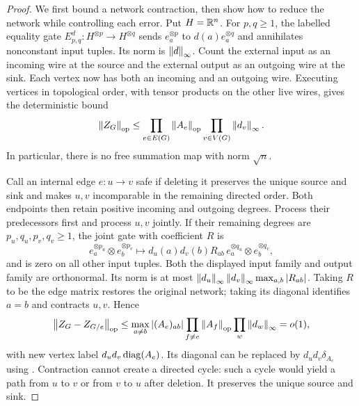 \begin{proof}
We first bound a network contraction, then show how to reduce the
network while controlling each error.  Put $H=\mathbb R^n$.  For
$p,q\ge1$, the labelled equality gate
$E^d_{p,q}:H^{\otimes p}\to H^{\otimes q}$ sends
$e_a^{\otimes p}$ to $d(a)e_a^{\otimes q}$ and annihilates
nonconstant input tuples.  Its norm is $\left\lVert d\right\rVert_\infty$.
Count the external input as an incoming wire at the source and the
external output as an outgoing wire at the sink.  Each vertex now
has both an incoming and an outgoing wire.  Executing vertices in
topological order, with tensor products on the other live wires,
gives the deterministic bound
\begin{equation}
 \left\lVert Z_G\right\rVert_{\mathrm{op}}
 \le\prod_{e\in E(G)}\left\lVert A_e\right\rVert_{\mathrm{op}}
                    \prod_{v\in V(G)}\left\lVert d_v\right\rVert_\infty.
 \label{eq:path-network-bound}
\end{equation}
In particular, there is no free summation map with norm $\sqrt n$.

Call an internal edge $e:u\to v$ safe if deleting it preserves
the unique source and sink and makes $u,v$ incomparable in the
remaining directed order.  Both endpoints then retain positive
incoming and outgoing degrees.  Process their predecessors first
and process $u,v$ jointly.  If their remaining degrees are
$p_u,q_u,p_v,q_v\ge1$, the joint gate with coefficient $R$ is
\[
 e_a^{\otimes p_u}\otimes e_b^{\otimes p_v}
 \longmapsto d_u(a)d_v(b)R_{ab}\,
       e_a^{\otimes q_u}\otimes e_b^{\otimes q_v},
\]
and is zero on all other input tuples.  Both the displayed input
family and output family are orthonormal.  Its norm is at most
$\left\lVert d_u\right\rVert_\infty\left\lVert d_v\right\rVert_\infty\max_{a,b}|R_{ab}|$.
Taking $R$ to be the edge matrix restores the original network;
taking its diagonal identifies $a=b$ and contracts $u,v$.  Hence
\begin{equation}
 \left\lVert Z_G-Z_{G/e}\right\rVert_{\mathrm{op}}
 \le\max_{a\ne b}|(A_e)_{ab}|
       \prod_{f\ne e}\left\lVert A_f\right\rVert_{\mathrm{op}}
       \prod_w\left\lVert d_w\right\rVert_\infty=o(1),
 \label{eq:path-network-pinch}
\end{equation}
with new vertex label $d_ud_v\operatorname{diag}(A_e)$.
Its diagonal can be replaced by $d_ud_v\delta_{A_e}$ using
.  Contraction cannot create a directed
cycle: such a cycle would yield a path from $u$ to $v$ or from $v$
to $u$ after deletion.  It preserves the unique source and sink.


\end{proof}

